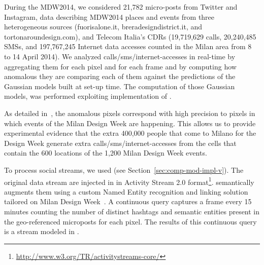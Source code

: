 During the MDW2014, we considered 21,782 micro-posts from Twitter and Instagram, data describing MDW2014 places and events from three heterogeneous sources (fuorisalone.it, breradesigndistrict.it, and tortonaroundesign.com), and Telecom Italia's CDRs (19,719,629 calls, 20,240,485 SMSs, and 197,767,245 Internet data accesses counted in the Milan area from 8 to 14 April 2014).
We analyzed calls/sms/internet-accesses in real-time by aggregating them for each pixel and for each frame and by computing how anomalous they are comparing each of them against the predictions of the Gaussian models built at set-up time. The computation of those Gaussian models, was performed exploiting \hivedi{} implementation of \river{}.

As detailed in~\cite{DBLP:journals/ieeemm/BalduiniVALAC15}, the anomalous pixels correspond with high precision to pixels in which events of the Milan Design Week are happening. This allows us to provide experimental evidence that the extra 400,000 people that come to Milano for the Design Week generate extra calls/sms/internet-accesses from the cells that contain the 600 locations of the 1,200 Milan Design Week events.

To process social streams, we used \sti{} (see Section~\ref{sec:comp-mod-impl-v}). The original data stream are injected in \sti{} in Activity Stream 2.0 format\footnote{\url{http://www.w3.org/TR/activitystreams-core/}}. \sti{} semantically augments them using a custom Named Entity recognition and linking solution tailored on Milan Design Week~\cite{DBLP:conf/semweb/BalduiniV13}. A continuous query captures a frame every 15 minutes counting the number of distinct hashtags and semantic entities present in the geo-referenced microposts for each pixel. The results of this continuous query is a stream modeled in \frappe{}.

